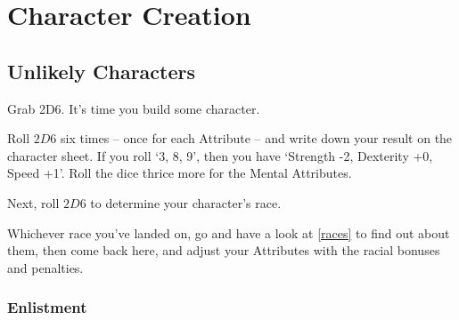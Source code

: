 \chapter{Character Creation}
\label{character_rolls}


\section{Unlikely Characters}

\begin{multicols}{2}

\noindent
Grab 2D6.
It's time you build some character.

\sidebox[18]{
  \attributeChart
}
\noindent
Roll $2D6$ six times -- once for each Attribute -- and write down your result on the character sheet.
If you roll `3, 8, 9', then you have `Strength -2, Dexterity +0, Speed +1'.
Roll the dice thrice more for the Mental Attributes.



Next, roll $2D6$ to determine your character's race.

Whichever race you've landed on, go and have a look at \autoref{races} to find out about them, then come back here, and adjust your Attributes with the racial bonuses and penalties.

\end{multicols}

\subsection{Enlistment}

\label{enlistment}

